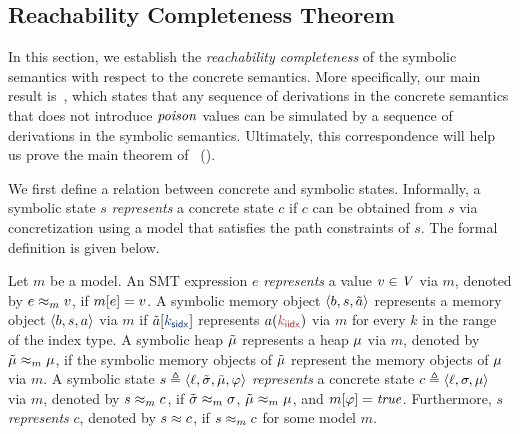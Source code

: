
\subsection{Reachability Completeness Theorem}
\label{sec:completeness}

In this section,
we establish the \emph{reachability completeness} of the symbolic semantics with respect to the concrete semantics.
More specifically, our main result is~,
which states that any sequence of derivations in the concrete semantics that does not introduce $\mathit{poison}$ values can be simulated by a sequence of derivations in the symbolic semantics.
Ultimately, this correspondence will help us prove the main theorem of~ ().

We first define a relation between concrete and symbolic states.
Informally, a symbolic state $s$ \emph{represents} a concrete state $c$ if $c$ can be obtained from $s$ via concretization using a model that satisfies the path constraints of $s$.
The formal definition is given below.

\begin{definition}
\label{def:over-approx-state}
Let $m$ be a model.
An SMT expression $e$ \emph{represents} a value $v \in \mathit{V}$ via $m$,
denoted by $e \approx_{m} v$, if $m[e] = v$.
A symbolic memory object $\langle{b},{s},{\tilde{a}}\rangle$ represents a memory object $\langle{b},{s},{a}\rangle$ via $m$ if
$\arrayselect{\smtarray}{\bvconst{\indexwidth}{k}}$ represents $\arrayvalue(\valoftype{k}{\indextype})$ via $m$ for every $k$ in the range of the index type.
A symbolic heap $\tilde{\mu}$ represents a heap $\mathit{\mu}$ via $m$, denoted by $\tilde{\mu} \approx_{m} \mathit{\mu}$,
if the symbolic memory objects of $\tilde{\mu}$ represent the memory objects of $\mathit{\mu}$ via $m$.
A symbolic state $s \triangleq \langle{\ell},{\tilde\sigma},{\tilde{\mu}},{\varphi}\rangle$ \emph{represents} a concrete state $c \triangleq \langle{\ell},{\sigma},{\mathit{\mu}}\rangle$ via $m$,
denoted by $s \approx_{m} c$,
if $\tilde\sigma \approx_{m} \sigma$,
$\tilde{\mu} \approx_{m} \mathit{\mu}$,
and $m[\varphi] = \mathit{true}$.
Furthermore, $s$ \emph{represents} $c$, denoted by $s \approx c$,
if $s \approx_{m} c$ for some model $m$.
\end{definition}

